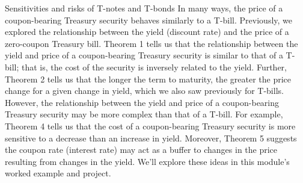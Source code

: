 \documentclass[11pt]{article}
\makeatletter
\theoremstyle{definition}
\renewcommand\subsubsection{\@startsection
	{subsubsection}{2}{0mm}
	{-0.05in}
	{-0.5\baselineskip}
	{\normalfont\normalsize\itshape\bfseries}}
\makeatother
\begin{document}

\subsubsection{Sensitivities and risks of T-notes and T-bonds}
In many ways, the price of a coupon-bearing Treasury security behaves similarly to a T-bill.
Previously, we explored the relationship between the yield (discount rate) and the price of a zero-coupon Treasury bill. Theorem 1 tells us that the relationship between the yield and price of a coupon-bearing Treasury security is similar to that of a T-bill; that is, the cost of the security is inversely related to the yield.
Further, Theorem 2 tells us that the longer the term to maturity, the greater the price change for a given change in yield, which we also saw previously for T-bills. However, the relationship between the yield and price of a coupon-bearing Treasury security may be more complex than that of a T-bill. For example, Theorem 4 tells us that the cost of a coupon-bearing Treasury security is more sensitive to a decrease than an increase in yield. Moreover, Theorem 5 suggests the coupon rate (interest rate) may act as a buffer to changes in the price resulting from changes in the yield. We'll explore these ideas in this module's worked example and project.
\end{document}

